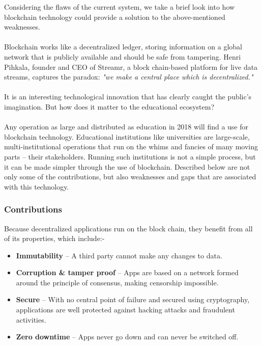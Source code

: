 Considering the flaws of the current system, we take a brief look into how blockchain technology could provide a solution to the above-mentioned weaknesses. \\ \\
Blockchain works like a decentralized ledger, storing information on a global network that is publicly available and should be safe from tampering. Henri Pihkala, founder and CEO of Streamr, a block chain-based platform for live data streams, captures the paradox: \textit{"we make a central place which is decentralized."} \\ \\
It is an interesting technological innovation that has clearly caught the public’s imagination. But how does it matter to the educational ecosystem?\\ \\ 
Any operation as large and distributed as education in 2018 will find a use for blockchain technology. Educational institutions like universities are large-scale, multi-institutional operations that run on the whims and fancies of many moving parts – their stakeholders. Running such institutions is not a simple process, but it can be made simpler through the use of blockchain. Described below are not only some of the contributions, but also weaknesses and gaps that are associated with this technology.

\subsubsection{Contributions}

Because decentralized applications run on the block chain, they benefit from all of its properties, which include:-\\
\begin{itemize}
\item \textbf{Immutability} – A third party cannot make any changes to data.
\item \textbf{Corruption \& tamper proof} – Apps are based on a network formed around the principle of consensus, making censorship impossible.
\item \textbf{Secure} – With no central point of failure and secured using cryptography, applications are well protected against hacking attacks and fraudulent activities.
\item \textbf{Zero downtime} – Apps never go down and can never be switched off.

\end{itemize}

